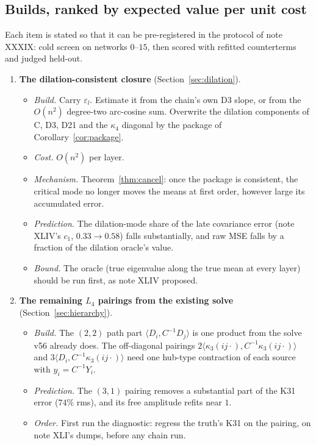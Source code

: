 \label{sec:next}
\subsection{Builds, ranked by expected value per unit cost}
Each item is stated so that it can be pre-registered in the protocol of note XXXIX: cold screen on networks $0$--$15$, then scored
with refitted counterterms and judged held-out.
\begin{enumerate}[leftmargin=*]
\item \textbf{The dilation-consistent closure} (Section~\ref{sec:dilation}).
\begin{itemize}
\item \emph{Build.} Carry $\varepsilon_l$. Estimate it from the chain's own D3 slope, or from the $O(n^2)$ degree-two arc-cosine sum.
Overwrite the dilation components of C, D3, D21 and the $\kappa_4$ diagonal by the package of Corollary~\ref{cor:package}.
\item \emph{Cost.} $O(n^2)$ per layer.
\item \emph{Mechanism.} Theorem~\ref{thm:cancel}: once the package is consistent, the critical mode no longer moves the means at first
order, however large its accumulated error.
\item \emph{Prediction.} The dilation-mode share of the late covariance error (note XLIV's $c_1$, $0.33\to0.58$) falls substantially, and
raw MSE falls by a fraction of the dilation oracle's value.
\item \emph{Bound.} The oracle (true eigenvalue along the true mean at every layer) should be run first, as note XLIV proposed.
\end{itemize}
\item \textbf{The remaining $L_4$ pairings from the existing solve} (Section~\ref{sec:hierarchy}).
\begin{itemize}
\item \emph{Build.} The $(2,2)$ path part $\langle D_i,C^{-1}D_j\rangle$ is one product from the solve v56 already does. The off-diagonal
pairings $2\langle\kappa_3(ij\cdot),C^{-1}\kappa_3(ij\cdot)\rangle$ and $3\langle D_i,C^{-1}\kappa_3(ij\cdot)\rangle$ need one hub-type contraction
of each source with $y_i=C^{-1}Y_i$.
\item \emph{Prediction.} The $(3,1)$ pairing removes a substantial part of the K31 error ($74\%$ rms), and its free amplitude refits
near $1$.
\item \emph{Order.} First run the diagnostic: regress the truth's K31 on the pairing, on note XLI's dumps, before any chain run.

\end{itemize}
\end{enumerate}
